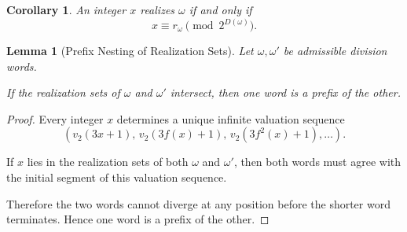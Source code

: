 \documentclass[12pt, oneside]{article}
\numberwithin{equation}{section}
\theoremstyle{definition}
\theoremstyle{plain}
\newtheorem{lemma}[theorem]{Lemma}
\newtheorem{corollary}[theorem]{Corollary}
\theoremstyle{remark}
\newtheorem*{remark}{Remark}
\begin{document}
\begin{corollary}
An integer $x$ realizes $\omega$ if and only if
\[
x \equiv r_\omega \pmod{2^{D(\omega)}}.
\]
\end{corollary}





\begin{lemma}[Prefix Nesting of Realization Sets]
\label{lem:prefix-uniqueness}
Let $\omega,\omega'$ be admissible division words.

If the realization sets of $\omega$ and $\omega'$ intersect, then one word
is a prefix of the other.
\end{lemma}

\begin{proof}
Every integer \(x\) determines a unique infinite valuation sequence
\[
(v_2(3x+1),\, v_2(3f(x)+1),\, v_2(3f^2(x)+1),\dots).
\]

If \(x\) lies in the realization sets of both \(\omega\) and \(\omega'\),
then both words must agree with the initial segment of this valuation sequence.

Therefore the two words cannot diverge at any position before the shorter
word terminates. Hence one word is a prefix of the other.
\end{proof}

\end{document}
